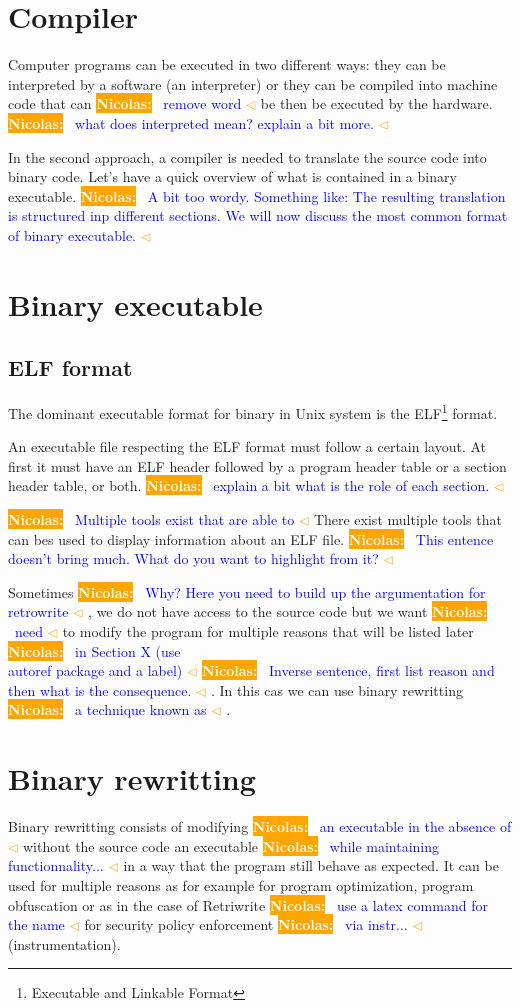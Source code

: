 \documentclass[a4paper,11pt,oneside]{report}
\newcommand{\todobox}[3]{%
	\colorbox{#1}{\textcolor{white}{\sffamily\bfseries\scriptsize #2}}%
	~\textcolor{blue}{#3} %
	\textcolor{#1}{$\triangleleft$}%
}
\newcommand{\nb}[1]{\todobox{orange}{Nicolas:}{#1}}
\begin{document}
\section{Compiler}
Computer programs can be executed in two different ways: they can be interpreted
by a software (an interpreter) or they can be compiled into machine code that can
\nb{remove word}be then be executed by the hardware. \nb{what does interpreted mean? explain a
bit more. }

In the second approach, a compiler is needed to translate the source code into binary code.
Let's have a quick overview of what is contained in a binary executable. \nb{A
bit too wordy. Something like: The resulting translation is structured inp
different sections. We will now discuss the most common format of binary executable.}

\section{Binary executable}
\subsection{ELF format}
%
The dominant executable format for binary in Unix system is the ELF\footnote{Executable
and Linkable Format} format. 

An executable file respecting the ELF format must follow a certain layout. At
first it must have an ELF header followed by a program header table or a section
header table, or both. \nb{explain a bit what is the role of each section.}

\nb{Multiple tools exist that are able to}There exist multiple tools that can bes
used to display information about an ELF file. \nb{This entence doesn't bring
much. What do you want to highlight from it?}

Sometimes\nb{Why? Here you need to build up the argumentation for retrowrite}, we do not have access to the source code but we want\nb{need} to modify the
program for multiple reasons that will be listed later \nb{in Section X (use
\\autoref package and a label)}\nb{Inverse sentence, first list reason and then
what is the consequence.}. In this cas we can use
binary rewritting \nb{a technique known as }.

\section{Binary rewritting}
Binary rewritting consists of modifying \nb{an executable in the absence of} without the source code an executable
\nb{while maintaining functionnality...}in a way that the program still behave as expected. It can be used for multiple
reasons as for example for program optimization, program obfuscation or as in
the case of Retriwrite\nb{use a latex command for the name} for security policy
enforcement \nb{via instr...}(instrumentation). 
\end{document}
